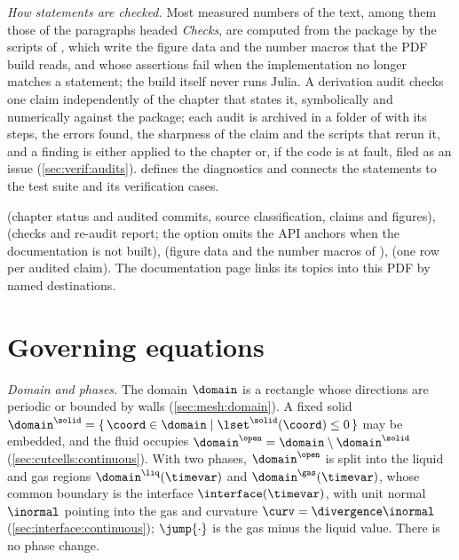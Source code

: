 \emph{How statements are checked.} Most measured numbers of the text, among
them those of the paragraphs headed \emph{Checks}, are computed from the
package by the scripts of , which write the
figure data and the number macros that the PDF build reads, and whose
assertions fail when the implementation no longer matches a statement; the
build itself never runs Julia. A derivation audit checks one claim
independently of the chapter that states it, symbolically and numerically
against the package; each audit is archived in a folder of
 with its steps, the errors found, the sharpness of the
claim and the scripts that rerun it, and a finding is either applied to the
chapter or, if the code is at fault, filed as an issue
(\cref{sec:verif:audits}).  defines the diagnostics
and connects the statements to the test suite and its verification cases.

\begin{implnote}
 (chapter status and audited commits,
source classification, claims and figures),
 (checks and re-audit report; the option
 omits the API anchors when the documentation is not
built),  (figure data and the number
macros of ), 
(one row per audited claim). The documentation page 
links its topics into this PDF by named destinations.
\end{implnote}

\section{Governing equations}\label{sec:overview:models}
\emph{Domain and phases.} The domain $\domain$ is a rectangle whose
directions are periodic or bounded by walls (\cref{sec:mesh:domain}). A
fixed solid $\domain^{\solid}=\set{\coord\in\domain}{\lset^{\solid}(\coord)\le0}$
may be embedded, and the fluid occupies
$\domain^{\open}=\domain\setminus\domain^{\solid}$
(\cref{sec:cutcells:continuous}). With two phases, $\domain^{\open}$ is split
into the liquid and gas regions $\domain^{\liq}(\timevar)$ and
$\domain^{\gas}(\timevar)$, whose common boundary is the interface
$\interface(\timevar)$, with unit normal $\inormal$ pointing into the gas and
curvature $\curv=\divergence\inormal$ (\cref{sec:interface:continuous});
$\jump{\cdot}$ is the gas minus the liquid value. There is no phase change.

